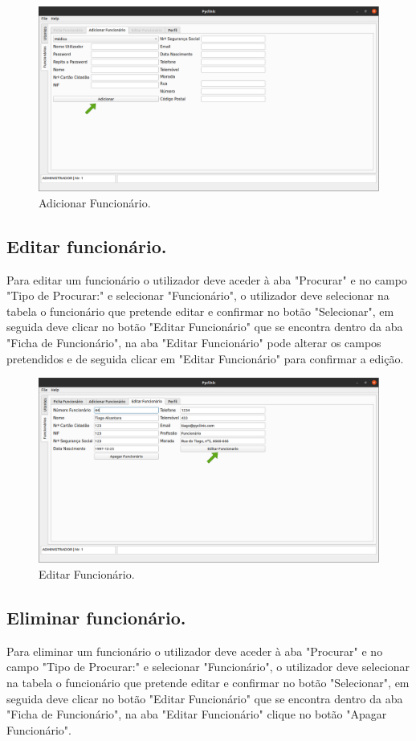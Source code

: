 \documentclass[11pt,a4paper,twoside]{article}
\begin{document}
\begin{figure}[H]
	\centering
	\includegraphics[width=0.9\linewidth]{image/admin/adicionarFuncionario.png}
	\caption{Adicionar Funcionário.}
	\label{fig:adicionarfuncionario}
\end{figure}

\subsection{Editar funcionário.}
Para editar um funcionário o utilizador deve aceder à aba "Procurar" e no campo "Tipo de Procurar:" e selecionar "Funcionário", o utilizador deve selecionar na tabela o funcionário que pretende editar e confirmar no botão "Selecionar", em seguida deve clicar no botão "Editar Funcionário" que se encontra dentro da aba "Ficha de Funcionário", na aba "Editar Funcionário" pode alterar os campos pretendidos e de seguida clicar em "Editar Funcionário" para confirmar a edição.

\begin{figure}[H]
	\centering
	\includegraphics[width=0.9\linewidth]{image/admin/EditarFuncionario.png}
	\caption{Editar Funcionário.}
	\label{fig:editarfuncionario}
\end{figure}

\subsection{Eliminar funcionário.}
Para eliminar um funcionário o utilizador deve aceder à aba "Procurar" e no campo "Tipo de Procurar:" e selecionar "Funcionário", o utilizador deve selecionar na tabela o funcionário que pretende editar e confirmar no botão "Selecionar", em seguida deve clicar no botão "Editar Funcionário" que se encontra dentro da aba "Ficha de Funcionário", na aba "Editar Funcionário" clique no botão "Apagar Funcionário".
\end{document}
